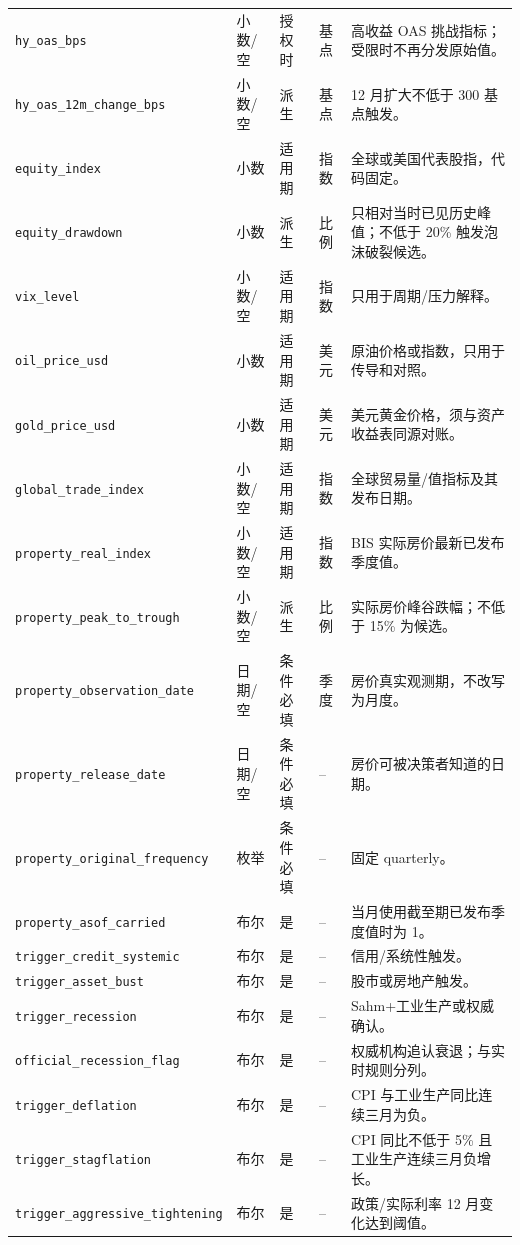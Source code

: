 \documentclass[UTF8,fontset=windows,12pt,openany]{ctexbook}
\newcommand{\Field}[1]{{\small\nolinkurl{#1}}}
\begin{document}
\begin{landscape}
\begin{longtable}{p{4.0cm}p{2.0cm}p{2.2cm}p{2.8cm}p{7.3cm}}
\Field{hy_oas_bps} & 小数/空 & 授权时 & 基点 & 高收益 OAS 挑战指标；受限时不再分发原始值\cite{fredhyoas}。\\
\Field{hy_oas_12m_change_bps} & 小数/空 & 派生 & 基点 & 12 月扩大不低于 300 基点触发。\\
\Field{equity_index} & 小数 & 适用期 & 指数 & 全球或美国代表股指，代码固定。\\
\Field{equity_drawdown} & 小数 & 派生 & 比例 & 只相对当时已见历史峰值；不低于 20\% 触发泡沫破裂候选。\\
\Field{vix_level} & 小数/空 & 适用期 & 指数 & 只用于周期/压力解释。\\
\Field{oil_price_usd} & 小数 & 适用期 & 美元 & 原油价格或指数，只用于传导和对照。\\
\Field{gold_price_usd} & 小数 & 适用期 & 美元 & 美元黄金价格，须与资产收益表同源对账。\\
\Field{global_trade_index} & 小数/空 & 适用期 & 指数 & 全球贸易量/值指标及其发布日期。\\
\Field{property_real_index} & 小数/空 & 适用期 & 指数 & BIS 实际房价最新已发布季度值\cite{bisproperty,bispropertydoc}。\\
\Field{property_peak_to_trough} & 小数/空 & 派生 & 比例 & 实际房价峰谷跌幅；不低于 15\% 为候选。\\
\Field{property_observation_date} & 日期/空 & 条件必填 & 季度 & 房价真实观测期，不改写为月度。\\
\Field{property_release_date} & 日期/空 & 条件必填 & -- & 房价可被决策者知道的日期。\\
\Field{property_original_frequency} & 枚举 & 条件必填 & -- & 固定 quarterly。\\
\Field{property_asof_carried} & 布尔 & 是 & -- & 当月使用截至期已发布季度值时为 1。\\
\Field{trigger_credit_systemic} & 布尔 & 是 & -- & 信用/系统性触发。\\
\Field{trigger_asset_bust} & 布尔 & 是 & -- & 股市或房地产触发。\\
\Field{trigger_recession} & 布尔 & 是 & -- & Sahm+工业生产或权威确认。\\
\Field{official_recession_flag} & 布尔 & 是 & -- & 权威机构追认衰退；与实时规则分列\cite{nberdating,nberchronology}。\\
\Field{trigger_deflation} & 布尔 & 是 & -- & CPI 与工业生产同比连续三月为负。\\
\Field{trigger_stagflation} & 布尔 & 是 & -- & CPI 同比不低于 5\% 且工业生产连续三月负增长。\\
\Field{trigger_aggressive_tightening} & 布尔 & 是 & -- & 政策/实际利率 12 月变化达到阈值。\\

\end{longtable}
\end{landscape}
\end{document}
